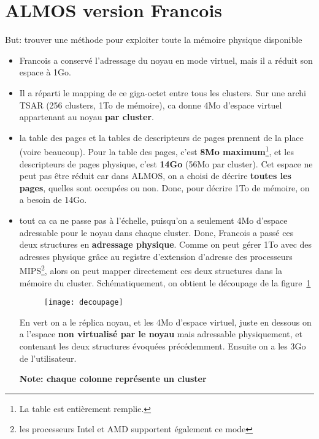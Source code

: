 \section{ALMOS version Francois}

But: trouver une méthode pour exploiter toute la mémoire physique disponible

\begin{itemize}

  \item Francois a conservé l'adressage du noyau en mode virtuel, mais il a
    réduit son espace à 1Go.
  
  \item Il a réparti le mapping de ce giga-octet entre tous les clusters. Sur
    une archi TSAR (256 clusters, 1To de mémoire), ca donne 4Mo d'espace virtuel
    appartenant au noyau \textbf{par cluster}. 

  \item la table des pages et la tables de descripteurs de pages prennent de la
    place (voire beaucoup). Pour la table des pages, c'est \textbf{8Mo
    maximum}\footnote{La table est entièrement remplie. }, et les
    descripteurs de pages physique, c'est \textbf{14Go} (56Mo par cluster). Cet
    espace ne peut pas être
    réduit car dans ALMOS, on a choisi de décrire \textbf{toutes les pages},
    quelles sont occupées ou non. Donc, pour décrire 1To de mémoire, on a besoin
    de 14Go.

  \item tout ca ca ne passe pas à l'échelle, puisqu'on a seulement 4Mo d'espace
    adressable  pour le noyau dans chaque cluster. Donc, Francois a passé ces
    deux structures en \textbf{adressage physique}. Comme on peut  gérer 1To
    avec des adresses physique grâce au registre d'extension d'adresse des
    processeurs MIPS\footnote{les processeurs Intel et AMD supportent également
    ce mode}, alors on peut mapper directement ces deux structures dans la
    mémoire du cluster. Schématiquement, on obtient le découpage de la
    figure~\ref{fig:decoupage}

    \begin{figure}[!h]
      \centering
      \texttt{[image: decoupage]}
      \label{fig:decoupage}
    \end{figure}

    En vert on a le réplica noyau, et les 4Mo d'espace virtuel, juste en dessous
    on a l'espace \textbf{non virtualisé par le noyau} mais adressable
    physiquement, et contenant les deux structures évoquées précédemment.
    Ensuite on a les 3Go de l'utilisateur.

    \textbf{Note: chaque colonne représente un cluster}

\end{itemize}


